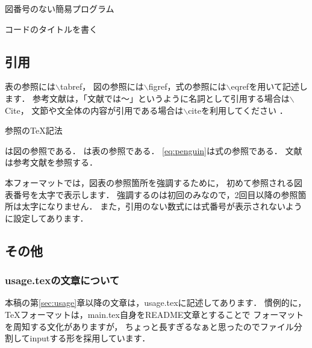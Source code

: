 \begin{lstbox}{図番号のない簡易プログラム}
\begin{minilst}
\begin{lstbox}{コードのタイトルを書く}
\begin{minilst}
	<ここにソースコード>
\end{minilst｝
\end{lstbox}
\end{minilst}
\end{lstbox}
\subsection{引用}
\label{sec:ref}
表の参照には$\backslash$tabref，
図の参照には$\backslash$figref，式の参照には$\backslash$eqrefを用いて記述します．
参考文献は，「文献\Cite{test2}では～」というように名詞として引用する場合は$\backslash$Cite，
文節や文全体の内容が引用である場合は$\backslash$citeを利用してください
\cite{test1}\cite{test3}．

\begin{lstbox}{参照のTeX記法}
\begin{minilst}
は図の参照である．
は表の参照である．
\eqref{eq:penguin}は式の参照である．
文献\Cite{penguin}は参考文献を参照する\cite{penguin}．
\end{minilst}
\end{lstbox}

本フォーマットでは，図表の参照箇所を強調するために，
初めて参照される図表番号を太字で表示します．
強調するのは初回のみなので，2回目以降の参照箇所は太字になりません．
また，引用のない数式には式番号が表示されないように設定してあります．

\subsection{その他}

\subsubsection{usage.texの文章について}
本稿の第\ref{sec:usage}章以降の文章は，usage.texに記述してあります．
慣例的に，TeXフォーマットは，main.tex自身をREADME文章とすることで
フォーマットを周知する文化がありますが，
ちょっと長すぎるなぁと思ったのでファイル分割してinputする形を採用しています．


\end{minilst}
\end{lstbox}
